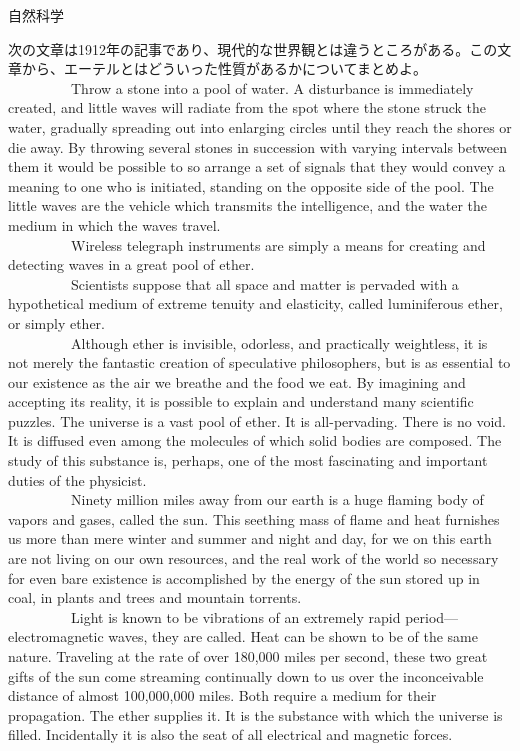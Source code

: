 \documentclass[b4paper,fleqn,dvipdfmx]{jsarticle}
\begin{document}
\begin{itembox}[l]{自然科学}

    次の文章は1912年の記事であり、現代的な世界観とは違うところがある。この文章から、エーテルとはどういった性質があるかについてまとめよ。\\
\ \ \ \ \ \ \ \ \ Throw a stone into a pool of water. A disturbance is immediately created, and little waves will radiate from the spot where the stone struck the water, gradually spreading out into enlarging circles until they reach the shores or die away. By throwing several stones in succession with varying intervals between them it would be possible to so arrange a set of signals that they would convey a meaning to one who is initiated, standing on the opposite side of the pool. The little waves are the vehicle which transmits the intelligence, and the water the medium in which the waves travel.\\
\ \ \ \ \ \ \ \ \ Wireless telegraph instruments are simply a means for creating and detecting waves in a great pool of ether.\\
\ \ \ \ \ \ \ \ \ Scientists suppose that all space and matter is pervaded with a hypothetical medium of extreme tenuity and elasticity, called luminiferous ether, or simply ether.\\
\ \ \ \ \ \ \ \ \ Although ether is invisible, odorless, and practically weightless, it is not merely the fantastic creation of speculative philosophers, but is as essential to our existence as the air we breathe and the food we eat. By imagining and accepting its reality, it is possible to explain and understand many scientific puzzles. The universe is a vast pool of ether. It is all-pervading. There is no void. It is diffused even among the molecules of which solid bodies are composed. The study of this substance is, perhaps, one of the most fascinating and important duties of the physicist.\\
\ \ \ \ \ \ \ \ \ Ninety million miles away from our earth is a huge flaming body of vapors and gases, called the sun. This seething mass of flame and heat furnishes us more than mere winter and summer and night and day, for we on this earth are not living on our own resources, and the real work of the world so necessary for even bare existence is accomplished by the energy of the sun stored up in coal, in plants and trees and mountain torrents.\\
\ \ \ \ \ \ \ \ \ Light is known to be vibrations of an extremely rapid period—electromagnetic waves, they are called. Heat can be shown to be of the same nature. Traveling at the rate of over 180,000 miles per second, these two great gifts of the sun come streaming continually down to us over the inconceivable distance of almost 100,000,000 miles. Both require a medium for their propagation. The ether supplies it. It is the substance with which the universe is filled. Incidentally it is also the seat of all electrical and magnetic forces.
\end{itembox}
\end{document}
